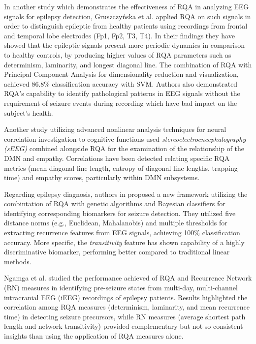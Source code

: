 \documentclass{article}
\begin{document}
			In another study which demonstrates the effectiveness of RQA in 
			analyzing EEG signals for epilepsy detection,
			Gruszczyńska et al.\cite{gruszczynska2019} applied RQA on such signals
			in order to distinguish epileptic from healthy patients using recordings 
			from frontal and temporal lobe electrodes (Fp1, Fp2, T3, T4). 
			In their findings they have showed that the epileptic signals present more periodic
			dynamics in comparison to healthy controls, by producing higher values of 
			RQA parameters such as determinism,
			laminarity, and longest diagonal line. The combination of RQA with
			Principal Component Analysis for dimensionality reduction and visualization, achieved 86.8\% 
			classification accuracy with SVM. Authors also demonstrated RQA's capability
			to identify pathological patterns in EEG signals without the 
			requirement of seizure events during recording which have bad impact on the subject's health.



			Another study utilizing advanced nonlinear analysis techniques for neural correlation investigation to
			cognitive functions \cite{mo} used \textit{stereoelectroencephalography (sEEG)} combined alongside RQA 
			for the examination of the relationship of the DMN and empathy. 
			Correlations have been detected relating specific RQA metrics 
			(mean diagonal line length, entropy of diagonal line lengths, trapping time) 
			and empathy scores, particularly within DMN subsystems. 

			Regarding epilepsy diagnosis, authors in \cite{palanisamy2024} proposed a new framework 
			utilizing the combintation of RQA with genetic algorithms and Bayesian classifiers for 
			identifying corresponding biomarkers for seizure detection. 
			They utilized five distance norms (e.g., Euclidean, Mahalanobis) and multiple thresholds 
			for extracting recurrence features from EEG signals, achieving 100\% classification accuracy. 
			More specific, the \textit{transitivity} feature has shown capability of a highly discriminative biomarker, 
			performing better compared to traditional linear methods. 

			Ngamga et al.\cite{ngamga2016} studied the performance achieved of RQA and Recurrence Network (RN) measures in identifying 
			pre-seizure states from multi-day, multi-channel intracranial EEG (iEEG) 
			recordings of epilepsy patients. 
			Results highlighted the correlation among RQA measures (determinism, laminarity, and mean recurrence time) in 
			detecting seizure precursors, while RN measures (average shortest path length and network transitivity) provided 
			complementary but not so consistent insights than using the application of RQA measures alone.
\end{document}
